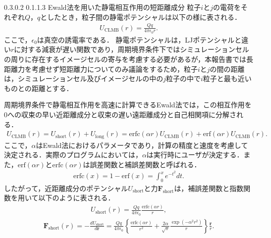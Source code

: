 \documentclass[uplatex,11pt,a4j,titlepage,oneside,openright,dvipdfmx]{jsbook}
\makeatletter
\renewcommand{\subsection}{%
   \@startsection{subsection}{1}{\z@}%
   {0.3\Cvs \@plus.0\Cdp \@minus.2\Cdp}%
   {0.1\Cvs \@plus.1\Cdp \@minus.3\Cdp}%
   {\reset@font\large\bfseries}}%
\makeatother
\begin{document}
\subsection{Ewald法を用いた静電相互作用の短距離成分}
粒子$i$と$j$の電荷をそれぞれ$Q$，$q$としたとき，粒子間の静電ポテンシャルは以下の様に表される．
\begin{eqnarray}
 U_{\mathrm{CLMB}}(r) = \frac{Qq}{4\pi\epsilon_0r}.
\end{eqnarray}
ここで，$\epsilon_0$は真空の誘電率である．
静電ポテンシャルは，LJポテンシャルと違い$r$に対する減衰が遅い関数であり，周期境界条件下ではシミュレーションセルの周りに存在するイメージセルの寄与を考慮する必要があるが，本報告書では長距離力を考慮せず短距離力についてのみ議論をするため，粒子$i$と$j$の間の距離は，シミュレーションセル及びイメージセルの中の$j$粒子の中で$i$粒子と最も近いものとの距離とする．

周期境界条件で静電相互作用を高速に計算できるEwald法では，この相互作用を0への収束の早い近距離成分と収束の遅い遠距離成分と自己相関項に分解される．
\begin{eqnarray}
 U_{\mathrm{CLMB}}(r) = U_{\mathrm{short}}(r) + U_{\mathrm{long}}(r) = \mathrm{erfc}(\alpha r) U_{\mathrm{CLMB}}(r) + \mathrm{erf}(\alpha r) U_{\mathrm{CLMB}}(r).
\end{eqnarray}
ここで，$\alpha$はEwald法におけるパラメータであり，計算の精度と速度を考慮して決定される．実際のプログラムにおいては，$\alpha$は実行時にユーザが決定する．また，$\mathrm{erf}(\alpha r)$と$\mathrm{erfc}(\alpha r)$は誤差関数と補誤差関数と呼ばれる．
\begin{eqnarray}
 \mathrm{erfc}(x) = 1 - \mathrm{erf}(x) = \int_{0}^{x}e^{-t^2}dt.
\end{eqnarray}
したがって，近距離成分のポテンシャル$U_{\mathrm{short}}$と力$\bm{F}_{\mathrm{short}}$は，補誤差関数と指数関数を用いて以下のように表される．
\begin{eqnarray} \label{eq:pot_clmb}
 U_{\mathrm{short}}(r) = \frac{Qq}{4\pi\epsilon_0} \frac{\mathrm{erfc}(\alpha r)}{r},
\end{eqnarray}
\begin{eqnarray} \label{eq:Coulomb}
 \bm{F}_{\mathrm{short}}(r) = -\frac{dU_{\mathrm{short}}}{d\bm{r}} = \frac{Qq}{4\pi\epsilon_0} \left\{ \frac{\mathrm{erfc}(\alpha r)}{r^2} + \frac{2\alpha}{\sqrt{\pi}}\frac{\exp(-\alpha^2r^2)}{r}\right\}\frac{\bm{r}}{r}.
\end{eqnarray}
\end{document}
